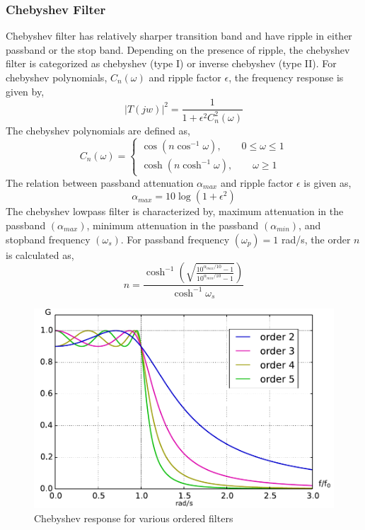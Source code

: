 \documentclass{lab_sheet}
\begin{document}
     \subsubsection{Chebyshev Filter}
     Chebyshev filter has relatively sharper transition band and have ripple in either passband or the stop band. Depending on the presence of ripple, the chebyshev filter is categorized as chebyshev (type I) or inverse chebyshev (type II). For chebyshev polynomials, $C_n(\omega)$ and ripple factor $\epsilon$, the frequency response is given by,
     \begin{equation}
        |T(jw)|^2=\frac{1}{1+\epsilon^2C_n^2(\omega)}
     \end{equation}
     The chebyshev polynomials are defined as,
\begin{equation}
  C_n(\omega)= \begin{cases}
     \cos(n\cos^{-1}\omega),\quad\quad 0\leq\omega\leq 1\\
     \cosh(n\cosh^{-1}\omega),\quad\quad \omega\geq 1
      \end{cases}
\end{equation}
The relation between passband attenuation $\alpha_{max}$ and ripple factor $\epsilon$ is given as,
\begin{equation}
   \alpha_{max}=10\log(1+\epsilon^2)
\end{equation}
The chebyshev lowpass filter is characterized by, maximum attenuation in the passband $(\alpha_{max})$, minimum attenuation in the passband $(\alpha_{min})$, and stopband frequency $(\omega_s)$. For passband frequency $(\omega_p)=1$ rad/s, the order $n$ is calculated as,
\begin{equation}
   n=\frac{\cosh^{-1}\left(\sqrt{\frac{10^{\alpha_{max}/10}-1}{10^{\alpha_{min}/10}-1}}\right)}{\cosh^{-1}\omega_s}
\end{equation}
\begin{figure}[H]
   \centering
   \includegraphics[width=0.7\linewidth]{../Figures/chebyshev.pdf}
   \caption{Chebyshev response for various ordered filters}
        \label{fig:chebyshev}
\end{figure}
\end{document}

